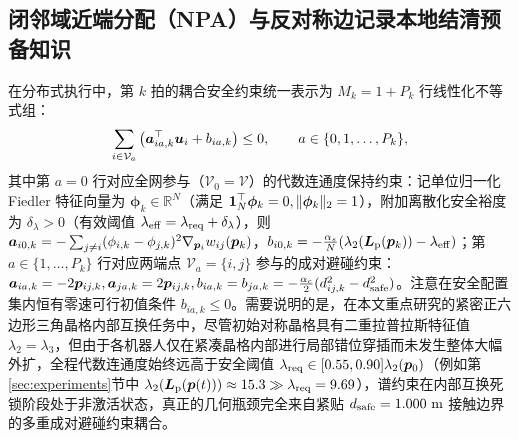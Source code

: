 \subsection{闭邻域近端分配（NPA）与反对称边记录本地结清预备知识}\label{subsec:npa-prelim}
在分布式执行中，第 $k$ 拍的耦合安全约束统一表示为 $M_k=1+P_k$ 行线性化不等式组：
\begin{equation}
 \sum_{i\in\mathcal V_a}\big(\boldsymbol a_{ia,k}^{\top}\boldsymbol{u}_i+b_{ia,k}\big)\le 0,\qquad a\in\{0,1,\dots,P_k\},
 \label{eq:coupled-rows}
\end{equation}
其中第 $a=0$ 行对应全网参与（$\mathcal V_0=\mathcal V$）的代数连通度保持约束：记单位归一化 Fiedler 特征向量为 $\boldsymbol\phi_k\in\mathbb R^N$（满足 $\boldsymbol 1_N^{\top}\boldsymbol\phi_k=0,\lVert\boldsymbol\phi_k\rVert_2=1$），附加离散化安全裕度为 $\delta_\lambda>0$（有效阈值 $\lambda_{\mathrm{eff}}=\lambda_{\mathrm{req}}+\delta_\lambda$），则 $\boldsymbol a_{i0,k}=-\sum_{j\ne i}(\phi_{i,k}-\phi_{j,k})^2\nabla_{\boldsymbol{p}_i}w_{ij}(\boldsymbol{p}_k)$，$b_{i0,k}=-\frac{\alpha_s}{N}(\lambda_2(\boldsymbol{L}_{\mathrm{p}}(\boldsymbol{p}_k))-\lambda_{\mathrm{eff}})$；第 $a\in\{1,\dots,P_k\}$ 行对应两端点 $\mathcal V_a=\{i,j\}$ 参与的成对避碰约束：$\boldsymbol a_{ia,k}=-2\boldsymbol{p}_{ij,k},\boldsymbol a_{ja,k}=2\boldsymbol{p}_{ij,k},b_{ia,k}=b_{ja,k}=-\frac{\alpha_c}{2}(d_{ij,k}^2-d_{\mathrm{safe}}^2)$。注意在安全配置集内恒有零速可行初值条件 $b_{ia,k}\le 0$。需要说明的是，在本文重点研究的紧密正六边形三角晶格内部互换任务中，尽管初始对称晶格具有二重拉普拉斯特征值 $\lambda_2=\lambda_3$，但由于各机器人仅在紧凑晶格内部进行局部错位穿插而未发生整体大幅外扩，全程代数连通度始终远高于安全阈值 $\lambda_{\mathrm{req}}\in[0.55,0.90]\lambda_2(\boldsymbol{p}_0)$（例如第\ref{sec:experiments}节中 $\lambda_2(\boldsymbol{L}_{\mathrm{p}}(\boldsymbol{p}(t)))\approx 15.3\gg\lambda_{\mathrm{req}}=9.69$），谱约束在内部互换死锁阶段处于非激活状态，真正的几何瓶颈完全来自紧贴 $d_{\mathrm{safe}}=1.000\ \mathrm m$ 接触边界的多重成对避碰约束耦合。

